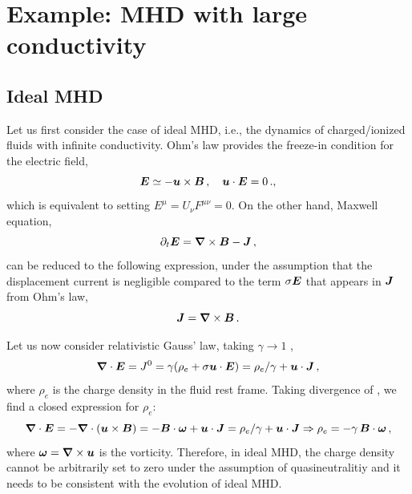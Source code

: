 \documentclass{article}
\begin{document}
\section{Example: MHD with large conductivity}

\subsection{Ideal MHD}

Let us first consider the case of ideal MHD, i.e., the dynamics of charged/ionized
fluids with infinite conductivity.
Ohm's law provides the freeze-in condition for the electric field,
\begin{equation}
    \EE \simeq - \uu \times \BB\,,
    \quad \uu \cdot \EE = 0 \,.,
    \label{ideal_MHD}
\end{equation}
which is equivalent to setting
$E^\mu = U_\nu F^{\mu \nu} = 0$.
On the other hand, Maxwell equation,
\begin{equation}
    \partial_t \EE = \nab \times \BB - \JJ\,,
\end{equation}
can be reduced to the following expression, under the assumption that
the displacement current is negligible compared to the term $\sigma \EE$
that appears in $\JJ$ from Ohm's law,
\begin{equation}
    \JJ = \nab \times \BB\,.
\end{equation}

Let us now consider relativistic Gauss' law, taking $\gamma \to 1$ \cite{RoperPol:2025lgc},
\begin{equation} \label{Gauss}
    \nab \cdot \EE = J^0 =
    \gamma (\rho_e + \sigma \uu \cdot \EE) =  \rho_e / \gamma  +
    \uu \cdot \JJ\,,
\end{equation}
where $\rho_e$ is the charge density
in the fluid rest frame.
Taking divergence of , we find a closed expression for $\rho_e$:
\begin{equation}
    \nab \cdot \EE = - \nab \cdot (\uu \times \BB) = - \BB \cdot \oom + \uu
    \cdot \JJ = \rho_e / \gamma 
    + \uu \cdot \JJ \Rightarrow \rho_e = 
    - \gamma\, \BB \cdot \oom\,,
\end{equation}
where $\oom = \nab \times \uu$ is the vorticity.
Therefore, in ideal MHD, the charge density cannot be arbitrarily set to zero
under the assumption of quasineutralitiy and it needs to be consistent
with the evolution of ideal MHD.
\end{document}
